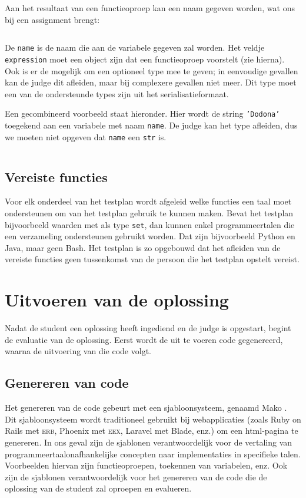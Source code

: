 Aan het resultaat van een functieoproep kan een naam gegeven worden, wat ons bij een assignment brengt:

\inputminted{json}{code/assignment.json}

De \texttt{name} is de naam die aan de variabele gegeven zal worden.
Het veldje \texttt{expression} moet een object zijn dat een functieoproep voorstelt (zie hierna).
Ook is er de mogelijk om een optioneel type mee te geven;
in eenvoudige gevallen kan de judge dit afleiden, maar bij complexere gevallen niet meer.
Dit type moet een van de ondersteunde types zijn uit het serialisatieformaat.

Een gecombineerd voorbeeld staat hieronder.
Hier wordt de string \texttt{'Dodona'} toegekend aan een variabele met naam \texttt{name}.
De judge kan het type afleiden, dus we moeten niet opgeven dat \texttt{name} een \texttt{str} is.

\inputminted{json}{code/assign-variable.json}

\subsection{Vereiste functies}\label{subsec:vereiste-functies}

Voor elk onderdeel van het testplan wordt afgeleid welke functies een taal moet ondersteunen om van het testplan gebruik te kunnen maken.
Bevat het testplan bijvoorbeeld waarden met als type \texttt{set}, dan kunnen enkel programmeertalen die een verzameling ondersteunen gebruikt worden.
Dat zijn bijvoorbeeld Python en Java, maar geen Bash.
Het testplan is zo opgebouwd dat het afleiden van de vereiste functies geen tussenkomst van de persoon die het testplan opstelt vereist.

\section{Uitvoeren van de oplossing}\label{sec:uitvoeren-van-de-oplossing}

Nadat de student een oplossing heeft ingediend en de judge is opgestart, begint de evaluatie van de oplossing.
Eerst wordt de uit te voeren code gegenereerd, waarna de uitvoering van die code volgt.

\subsection{Genereren van code}\label{subsec:genereren-van-code}

Het genereren van de code gebeurt met een sjabloonsysteem, genaamd Mako \autocite{mako}.
Dit sjabloonsysteem wordt traditioneel gebruikt bij webapplicaties (zoals Ruby on Rails met \textsc{erb}, Phoenix met \textsc{eex}, Laravel met Blade, enz.) om een html-pagina te genereren.
In ons geval zijn de sjablonen verantwoordelijk voor de vertaling van programmeertaalonafhankelijke concepten naar implementaties in specifieke talen.
Voorbeelden hiervan zijn functieoproepen, toekennen van variabelen, enz.
Ook zijn de sjablonen verantwoordelijk voor het genereren van de code die de oplossing van de student zal oproepen en evalueren.

